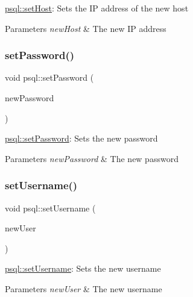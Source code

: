 \mbox{\hyperlink{classpsql_a96b3b9483f1a642c026d4b5cf505eb75}{psql\+::set\+Host}}\+: Sets the IP address of the new host 


\begin{DoxyParams}{Parameters}
{\em new\+Host} & The new IP address \\
\hline
\end{DoxyParams}
\mbox{\label{classpsql_a6c29350037550b7e5a5bb8f439c405f3}} 
\subsubsection{\texorpdfstring{set\+Password()}{setPassword()}}
{\footnotesize\ttfamily void psql\+::set\+Password (\begin{DoxyParamCaption}\item[{Q\+String}]{new\+Password }\end{DoxyParamCaption})}



\mbox{\hyperlink{classpsql_a6c29350037550b7e5a5bb8f439c405f3}{psql\+::set\+Password}}\+: Sets the new password 


\begin{DoxyParams}{Parameters}
{\em new\+Password} & The new password \\
\hline
\end{DoxyParams}
\mbox{\label{classpsql_a1488a9e4909abd172651b7be240342cb}} 
\subsubsection{\texorpdfstring{set\+Username()}{setUsername()}}
{\footnotesize\ttfamily void psql\+::set\+Username (\begin{DoxyParamCaption}\item[{Q\+String}]{new\+User }\end{DoxyParamCaption})}



\mbox{\hyperlink{classpsql_a1488a9e4909abd172651b7be240342cb}{psql\+::set\+Username}}\+: Sets the new username 


\begin{DoxyParams}{Parameters}
{\em new\+User} & The new username \\
\hline
\end{DoxyParams}
\mbox{\label{classpsql_a836eea3c6deb2d6a3a357193a99d6ee7}} 
